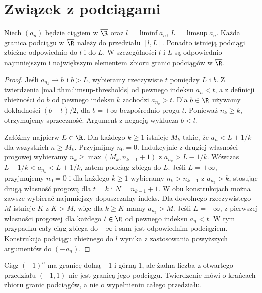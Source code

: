 \section{Związek z podciągami}
\begin{twierdzenie}
\label{ma1:thm:extremal-subsequence-limits}
Niech $(a_n)$ będzie ciągiem w $\overline{\R}$ oraz $l=\liminf a_n$, $L=\limsup a_n$. Każda granica podciągu w $\overline{\R}$ należy do przedziału $[l,L]$. Ponadto istnieją podciągi zbieżne odpowiednio do $l$ i do $L$. W szczególności $l$ i $L$ są odpowiednio najmniejszym i największym elementem zbioru granic podciągów w $\overline{\R}$.
\end{twierdzenie}
\begin{proof}
Jeśli $a_{n_k}\to b$ i $b>L$, wybieramy rzeczywiste $t$ pomiędzy $L$ i $b$. Z twierdzenia \ref{ma1:thm:limsup-thresholds} od pewnego indeksu $a_n<t$, a z definicji zbieżności do $b$ od pewnego indeksu $k$ zachodzi $a_{n_k}>t$. Dla $b\in\R$ używamy dokładności $(b-t)/2$, dla $b=+\infty$ bezpośrednio progu $t$. Ponieważ $n_k\ge k$, otrzymujemy sprzeczność. Argument z negacją wyklucza $b<l$.

Załóżmy najpierw $L\in\R$. Dla każdego $k\ge1$ istnieje $M_k$ takie, że $a_n<L+1/k$ dla wszystkich $n\ge M_k$. Przyjmijmy $n_0=0$. Indukcyjnie z drugiej własności progowej wybieramy $n_k\ge\max(M_k,n_{k-1}+1)$ z $a_{n_k}>L-1/k$. Wówczas $L-1/k<a_{n_k}<L+1/k$, zatem podciąg zbiega do $L$.
Jeśli $L=+\infty$, przyjmujemy $n_0=0$ i dla każdego $k\ge1$ wybieramy $n_k>n_{k-1}$ z $a_{n_k}>k$, stosując drugą własność progową dla $t=k$ i $N=n_{k-1}+1$. W obu konstrukcjach można zawsze wybierać najmniejszy dopuszczalny indeks. Dla dowolnego rzeczywistego $M$ istnieje $K$ z $K>M$, więc dla $k\ge K$ mamy $a_{n_k}>M$. Jeśli $L=-\infty$, z pierwszej własności progowej dla każdego $t\in\R$ od pewnego indeksu $a_n<t$. W tym przypadku cały ciąg zbiega do $-\infty$ i sam jest odpowiednim podciągiem. Konstrukcja podciągu zbieżnego do $l$ wynika z zastosowania powyższych argumentów do $(-a_n)$.
\end{proof}
\begin{przyklad}
Ciąg $(-1)^n$ ma granicę dolną $-1$ i górną $1$, ale żadna liczba z otwartego przedziału $(-1,1)$ nie jest granicą jego podciągu. Twierdzenie mówi o krańcach zbioru granic podciągów, a nie o wypełnieniu całego przedziału.
\end{przyklad}

